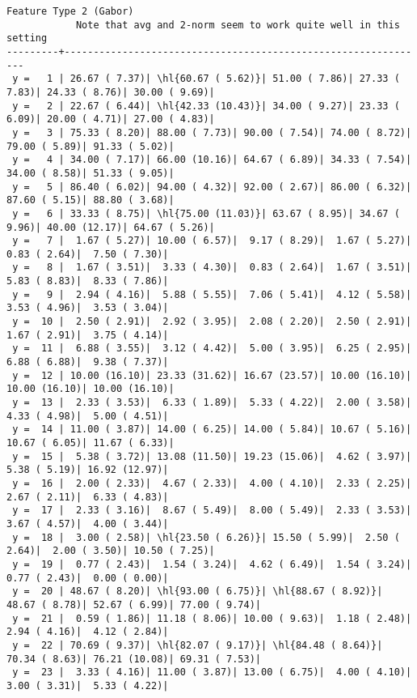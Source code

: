 \documentclass[10pt]{article}
\newcommand{\hl}[1]{\textcolor{blue}{#1}}
\begin{document}
\begin{Verbatim}[fontsize=\small, commandchars=\\\{\}]
            Feature Type 2 (Gabor)
            Note that avg and 2-norm seem to work quite well in this setting
---------+---------------------------------------------------------------
 y =   1 | 26.67 ( 7.37)| \hl{60.67 ( 5.62)}| 51.00 ( 7.86)| 27.33 ( 7.83)| 24.33 ( 8.76)| 30.00 ( 9.69)|
 y =   2 | 22.67 ( 6.44)| \hl{42.33 (10.43)}| 34.00 ( 9.27)| 23.33 ( 6.09)| 20.00 ( 4.71)| 27.00 ( 4.83)|
 y =   3 | 75.33 ( 8.20)| 88.00 ( 7.73)| 90.00 ( 7.54)| 74.00 ( 8.72)| 79.00 ( 5.89)| 91.33 ( 5.02)|
 y =   4 | 34.00 ( 7.17)| 66.00 (10.16)| 64.67 ( 6.89)| 34.33 ( 7.54)| 34.00 ( 8.58)| 51.33 ( 9.05)|
 y =   5 | 86.40 ( 6.02)| 94.00 ( 4.32)| 92.00 ( 2.67)| 86.00 ( 6.32)| 87.60 ( 5.15)| 88.80 ( 3.68)|
 y =   6 | 33.33 ( 8.75)| \hl{75.00 (11.03)}| 63.67 ( 8.95)| 34.67 ( 9.96)| 40.00 (12.17)| 64.67 ( 5.26)|
 y =   7 |  1.67 ( 5.27)| 10.00 ( 6.57)|  9.17 ( 8.29)|  1.67 ( 5.27)|  0.83 ( 2.64)|  7.50 ( 7.30)|
 y =   8 |  1.67 ( 3.51)|  3.33 ( 4.30)|  0.83 ( 2.64)|  1.67 ( 3.51)|  5.83 ( 8.83)|  8.33 ( 7.86)|
 y =   9 |  2.94 ( 4.16)|  5.88 ( 5.55)|  7.06 ( 5.41)|  4.12 ( 5.58)|  3.53 ( 4.96)|  3.53 ( 3.04)|
 y =  10 |  2.50 ( 2.91)|  2.92 ( 3.95)|  2.08 ( 2.20)|  2.50 ( 2.91)|  1.67 ( 2.91)|  3.75 ( 4.14)|
 y =  11 |  6.88 ( 3.55)|  3.12 ( 4.42)|  5.00 ( 3.95)|  6.25 ( 2.95)|  6.88 ( 6.88)|  9.38 ( 7.37)|
 y =  12 | 10.00 (16.10)| 23.33 (31.62)| 16.67 (23.57)| 10.00 (16.10)| 10.00 (16.10)| 10.00 (16.10)|
 y =  13 |  2.33 ( 3.53)|  6.33 ( 1.89)|  5.33 ( 4.22)|  2.00 ( 3.58)|  4.33 ( 4.98)|  5.00 ( 4.51)|
 y =  14 | 11.00 ( 3.87)| 14.00 ( 6.25)| 14.00 ( 5.84)| 10.67 ( 5.16)| 10.67 ( 6.05)| 11.67 ( 6.33)|
 y =  15 |  5.38 ( 3.72)| 13.08 (11.50)| 19.23 (15.06)|  4.62 ( 3.97)|  5.38 ( 5.19)| 16.92 (12.97)|
 y =  16 |  2.00 ( 2.33)|  4.67 ( 2.33)|  4.00 ( 4.10)|  2.33 ( 2.25)|  2.67 ( 2.11)|  6.33 ( 4.83)|
 y =  17 |  2.33 ( 3.16)|  8.67 ( 5.49)|  8.00 ( 5.49)|  2.33 ( 3.53)|  3.67 ( 4.57)|  4.00 ( 3.44)|
 y =  18 |  3.00 ( 2.58)| \hl{23.50 ( 6.26)}| 15.50 ( 5.99)|  2.50 ( 2.64)|  2.00 ( 3.50)| 10.50 ( 7.25)|
 y =  19 |  0.77 ( 2.43)|  1.54 ( 3.24)|  4.62 ( 6.49)|  1.54 ( 3.24)|  0.77 ( 2.43)|  0.00 ( 0.00)|
 y =  20 | 48.67 ( 8.20)| \hl{93.00 ( 6.75)}| \hl{88.67 ( 8.92)}| 48.67 ( 8.78)| 52.67 ( 6.99)| 77.00 ( 9.74)|
 y =  21 |  0.59 ( 1.86)| 11.18 ( 8.06)| 10.00 ( 9.63)|  1.18 ( 2.48)|  2.94 ( 4.16)|  4.12 ( 2.84)|
 y =  22 | 70.69 ( 9.37)| \hl{82.07 ( 9.17)}| \hl{84.48 ( 8.64)}| 70.34 ( 8.63)| 76.21 (10.08)| 69.31 ( 7.53)|
 y =  23 |  3.33 ( 4.16)| 11.00 ( 3.87)| 13.00 ( 6.75)|  4.00 ( 4.10)|  3.00 ( 3.31)|  5.33 ( 4.22)|

\end{Verbatim}
\end{document}
